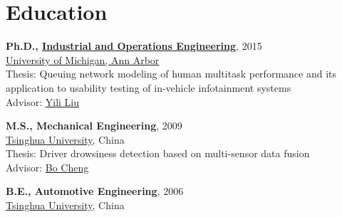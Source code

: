 \documentclass[11pt]{article}
\newenvironment{main}
{\begin{adjustwidth}{3em}{}}
{\end{adjustwidth}}
\begin{document}
\section*{Education}
\begin{main}

\textbf{Ph.D., \href{https://ioe.engin.umich.edu/}{Industrial and Operations Engineering}}, 2015\\
\href{https://umich.edu/}{University of Michigan, Ann Arbor}\\
Thesis: Queuing network modeling of human multitask performance and its application to usability testing of in-vehicle infotainment systems\\
Advisor: \href{https://ioe.engin.umich.edu/people/yili-liu/}{Yili Liu}

\textbf{M.S., Mechanical Engineering}, 2009\\
\href{https://www.tsinghua.edu.cn/en/index.htm}{Tsinghua University}, China\\
Thesis: Driver drowsiness detection based on multi-sensor data fusion\\
Advisor: \href{http://www.svm.tsinghua.edu.cn/essay/74/364.html}{Bo Cheng}

\textbf{B.E., Automotive Engineering}, 2006\\
\href{https://www.tsinghua.edu.cn/en/index.htm}{Tsinghua University}, China


\end{main}
\end{document}
